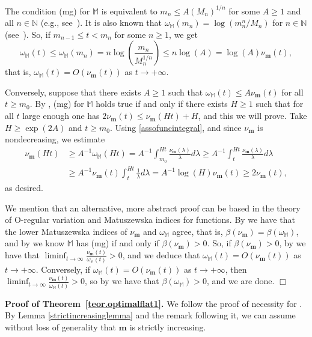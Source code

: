 \documentclass[11pt,a4paper]{article}
\theoremstyle{plain}
\theoremstyle{definition}
\newenvironment{proof1}{\medskip\par\noindent{\bf Proof.}}{\hfill $\Box$
\medskip\par}
\newcommand{\N}{\mathbb{N}}
\newcommand{\M}{\mathbb{M}}
\newcommand{\m}{\boldsymbol{m}}
\begin{document}
\begin{proof1}
The condition (mg) for $\M$ is equivalent to $m_n\le A(M_n)^{1/n}$ for some $A\ge 1$ and all $n\in\N$ (e.g., see~\cite[Lemma 2.2]{RainerSchindlExtension17}).
It is also known that $\omega_\M(m_n)=\log\left(m_{n}^n/M_n\right)$ for $n\in\N$ (see~\cite[Chapitre I]{Mandelbrojt}). So, if $m_{n-1}\le t<m_{n}$ for some $n\ge 1$, we get
$$
\omega_\M(t)\le\omega_\M(m_n)=n\log\left(\frac{m_n}{M_n^{1/n}}\right)\le n\log(A)=\log(A)\nu_{\m}(t),
$$
that is, $\omega_\M(t)=O(\nu_{\m}(t))$ as $t\rightarrow+\infty$.\vspace{6pt}

Conversely, suppose that there exists $A\ge 1$ such that $\omega_\M(t)\le A\nu_{\m}(t)$ for all $t\ge m_0$. By \cite[Lemma 2.2]{RainerSchindlExtension17}, (mg) for $\M$ holds true if and only if there exists $H\geq 1$ such that for all $t$ large enough one has $2\nu_{\m}(t)\leq\nu_{\m}(H t)+H$, and this we will prove. Take $H\ge \exp(2A)$ and $t\ge m_0$. Using \eqref{assofuncintegral}, and since $\nu_{\m}$ is nondecreasing, we estimate
\begin{align*}
\nu_{\m}(Ht)&\ge A^{-1}\omega_\M(Ht)= A^{-1}\int_{m_0}^{Ht}\frac{\nu_{\m}(\lambda)}{\lambda}d\lambda\ge A^{-1}\int_t^{Ht}\frac{\nu_{\m}(\lambda)}{\lambda}d\lambda
\\&
\ge A^{-1}\nu_{\m}(t)\int_t^{Ht}\frac{1}{\lambda}d\lambda= A^{-1}\log(H)\nu_{\m}(t)\ge 2\nu_{\m}(t),
\end{align*}
as desired.

We mention that an alternative, more abstract proof can be based in the theory of O-regular variation and Matuszewska indices for  functions. By \cite[Th. 4.4]{JimenezSanzSchindlIndex} we have that the lower Matuszewska indices of $\nu_{\m}$ and $\omega_{\M}$ agree, that is, $\beta(\nu_{\m})= \beta(\omega_\M)$, and by \cite[Cor.2.17 and Cor. 4.2]{JimenezSanzSchindlIndex} we know $\M$ has (mg) if and only if $\beta(\nu_{\m})>0$. So, if $\beta(\nu_{\m})>0$, by \cite[Th. 4.3]{JimenezSanzSchindlIndex} we have that $\liminf_{t\to\infty} \frac{\nu_{\m}(t)}{\omega_\M(t)}>0$, and we deduce that $\omega_\M(t)=O(\nu_{\m}(t))$ as $t\rightarrow+\infty$. Conversely, if $\omega_\M(t)=O(\nu_{\m}(t))$ as $t\rightarrow+\infty$, then  $\liminf_{t\to\infty} \frac{\nu_{\m}(t)}{\omega_\M(t)}>0$, so by \cite[Th. 4.3]{JimenezSanzSchindlIndex} we have that   $\beta(\omega_{\M})>0$, and we are done.
\end{proof1}

\noindent\textbf{Proof of Theorem~\ref{teor.optimalflat1}. } We follow the proof of necessity for \cite[Th.~2.2]{Brunaext80}. By Lemma \ref{strictincreasinglemma} and the remark following it, we can assume without loss of generality that $\m$ is strictly increasing.
\end{document}
